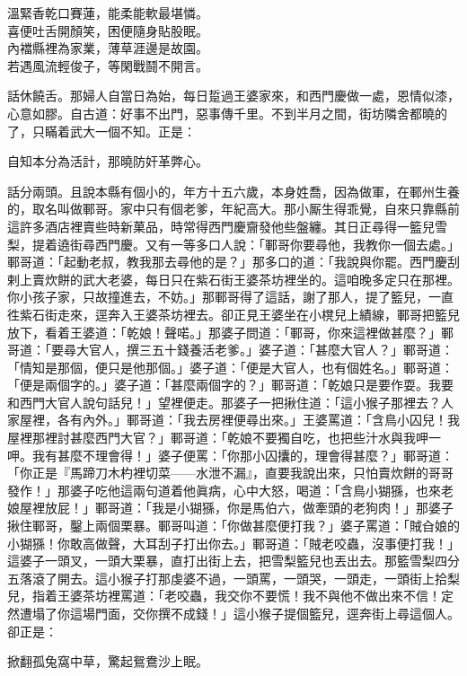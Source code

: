 \begin{myquote} 
溫緊香乾口賽蓮，能柔能軟最堪憐。\\喜便吐舌開顏笑，困便隨身貼股眠。\\內襠縣裡為家業，薄草涯邊是故園。\\若遇風流輕俊子，等閑戰鬪不開言。
\end{myquote} 

話休饒舌。那婦人自當日為始，每日踅過王婆家來，和西門慶做一處，恩情似漆，心意如膠。自古道：好事不出門，惡事傳千里。不到半月之間，街坊隣舍都曉的了，只瞞着武大一個不知。正是：

\begin{myquote} 
自知本分為活計，那曉防奸革弊心。
\end{myquote} 

話分兩頭。且說本縣有個小的，年方十五六歲，本身姓喬，因為做軍，在鄆州生養的，取名叫做鄆哥。家中只有個老爹，年紀高大。那小厮生得乖覺，自來只靠縣前這許多酒店裡賣些時新菓品，時常得西門慶齎發他些盤纏。{}其日正尋得一籃兒雪梨，提着遶街尋西門慶。又有一等多口人說：「鄆哥你要尋他，我教你一個去處。」鄆哥道：「起動老叔，教我那去尋他的是？」那多口的道：「我說與你罷。西門慶刮剌上賣炊餅的武大老婆，每日只在紫石街王婆茶坊裡坐的。這咱晚多定只在那裡。你小孩子家，只故撞進去，不妨。」那鄆哥得了這話，謝了那人，提了籃兒，一直徃紫石街走來，逕奔入王婆茶坊裡去。卻正見王婆坐在小櫈兒上績線，鄆哥把籃兒放下，看着王婆道：「乾娘！聲喏。」那婆子問道：「鄆哥，你來這裡做甚麼？」鄆哥道：「要尋大官人，撰三五十錢養活老爹。」婆子道：「甚麼大官人？」鄆哥道：「情知是那個，便只是他那個。」{}婆子道：「便是大官人，也有個姓名。」鄆哥道：「便是兩個字的。」婆子道：「甚麼兩個字的？」鄆哥道：「乾娘只是要作耍。我要和西門大官人說句話兒！」望裡便走。那婆子一把揪住道：「這小猴子那裡去？人家屋裡，各有內外。」鄆哥道：「我去房裡便尋出來。」王婆罵道：「含鳥小囚兒！我屋裡那裡討甚麼西門大官？」鄆哥道：「乾娘不要獨自吃，也把些汁水與我呷一呷。{}我有甚麼不理會得！」婆子便罵：「你那小囚攮的，理會得甚麼？」鄆哥道：「你正是『馬蹄刀木杓裡切菜——水泄不漏』，直要我說出來，只怕賣炊餅的哥哥發作！」{}那婆子吃他這兩句道着他眞病，心中大怒，喝道：「含鳥小猢猻，也來老娘屋裡放屁！」鄆哥道：「我是小猢猻，你是馬伯六，做牽頭的老狗肉！」{}那婆子揪住鄆哥，鑿上兩個栗暴。鄆哥叫道：「你做甚麼便打我？」婆子罵道：「賊㒲娘的小猢猻！你敢高做聲，大耳刮子打出你去。」鄆哥道：「賊老咬蟲，沒事便打我！」這婆子一頭叉，一頭大栗暴，直打出街上去，把雪梨籃兒也丟出去。那籃雪梨四分五落滾了開去。這小猴子打那虔婆不過，一頭罵，一頭哭，一頭走，一頭街上拾梨兒，{}指着王婆茶坊裡罵道：「老咬蟲，我交你不要慌！我不與他不做出來不信！定然遭塌了你這場門面，交你撰不成錢！」這小猴子提個籃兒，逕奔街上尋這個人。卻正是：

\begin{myquote} 
掀翻孤兔窩中草，驚起鴛鴦沙上眠。{}
\end{myquote} 

